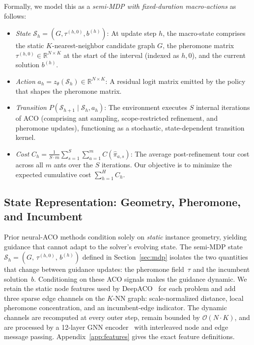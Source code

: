 Formally, we model this as a \emph{semi-MDP with fixed-duration macro-actions} as follows:
\begin{itemize}[topsep=0pt]
\item \emph{State} $\mathcal{S}_h = (G, \tau^{(h,0)}, b^{(h)})$: At update step $h$, the macro-state comprises the static $K$-nearest-neighbor candidate graph $G$, the pheromone matrix $\tau^{(h,0)} \in \mathbb{R}^{N \times K}$ at the start of the interval (indexed as $h,0$), and the current solution $b^{(h)}$.
\item \emph{Action} $a_h = z_\theta(\mathcal{S}_h) \in \mathbb{R}^{N \times K}$: A residual logit matrix emitted by the \DyNACO{} policy that shapes the pheromone matrix.
\item \emph{Transition} $P(\mathcal{S}_{h+1} \mid \mathcal{S}_h, a_h)$: The environment executes $S$ internal iterations of ACO (comprising ant sampling, scope-restricted refinement, and pheromone updates), functioning as a stochastic, state-dependent transition kernel.
\item \emph{Cost} $C_h = \frac{1}{S \cdot m} \sum_{s=1}^{S} \sum_{a=1}^{m} C(\hat{\pi}_{a,s})$: The average post-refinement tour cost across all $m$ ants over the $S$ iterations. Our objective is to minimize the expected cumulative cost $\sum_{h=1}^H C_h$.
\end{itemize}

\subsection{State Representation: Geometry, Pheromone, and Incumbent}
\label{sec:agent}


\label{sec:state}
Prior neural-ACO methods condition solely on \emph{static} instance geometry, yielding guidance that cannot adapt to the solver's evolving state. The semi-MDP state $\mathcal{S}_h = (G,\, \tau^{(h,0)},\, b^{(h)})$ defined in Section~\ref{sec:mdp} isolates the two quantities that change between guidance updates: the pheromone field~$\tau$ and the incumbent solution~$b$. Conditioning on these ACO signals makes the guidance dynamic. We retain the static node features used by DeepACO~\cite{deepaco} for each problem and add three sparse edge channels on the $K$-NN graph: scale-normalized distance, local pheromone concentration, and an incumbent-edge indicator. The dynamic channels are recomputed at every outer step, remain bounded by $\mathcal{O}(N \cdot K)$, and are processed by a 12-layer GNN encoder~\cite{deepaco} with interleaved node and edge message passing. Appendix~\ref{app:features} gives the exact feature definitions.

